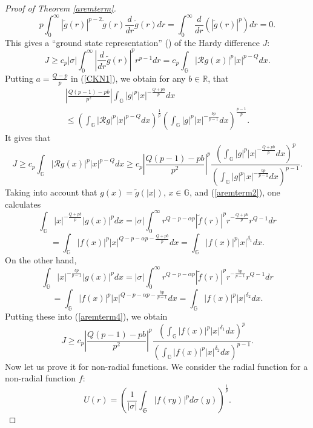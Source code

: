 \documentclass[a4paper,12pt,reqno]{amsart}
\renewcommand\eqref[1]{(\ref{#1})} %
\numberwithin{equation}{section}
\theoremstyle{plain}
\theoremstyle{definition}
\renewcommand{\wp}{\mathfrak S}
\begin{document}
\begin{proof}[Proof of Theorem \ref{aremterm}]
$$p\int_{0}^{\infty}|\widetilde{g}(r)|^{p-2}\widetilde{g}(r)\frac{d}{dr}\widetilde{g}(r)dr=\int_{0}^{\infty}
\frac{d}{dr}(|\widetilde{g}(r)|^{p})dr=0.$$
This gives a \enquote{ground state representation} (\cite{FrS08}) of the Hardy difference $J$:
\begin{equation}\label{aremterm3}
J\geq c_{p} |\sigma|\int_{0}^{\infty}\left|\frac{d}{dr}\widetilde{g}(r)\right|^{p}r^{p-1}dr=
c_{p}\int_{\mathbb{G}}|\mathcal{R}g(x)|^{p}|x|^{p-Q}dx.
\end{equation}
Putting $a=\frac{Q-p}{p}$ in \eqref{CKN1}, we obtain for any $b\in\mathbb{R}$, that
\begin{multline}\label{CKN2}
\left|\frac{Q(p-1)-pb}{p^{2}}\right|\int_{\mathbb{G}}|g|^{p}
|x|^{-\frac{Q+pb}{p}}dx \\
\leq\left(\int_{\mathbb{G}}
|\mathcal{R}g|^{p}|x|^{p-Q}dx\right)^{\frac{1}{p}}\left(\int_{\mathbb{G}}
|g|^{p}|x|^{-\frac{bp}{p-1}}dx\right)^{\frac{p-1}{p}}.
\end{multline}
It gives that
\begin{equation}\label{aremterm4}J\geq c_{p}\int_{\mathbb{G}}|\mathcal{R}g(x)|^{p}|x|^{p-Q}dx\geq c_{p}
\left|\frac{Q(p-1)-pb}{p^{2}}\right|^{p}\frac{\left(\int_{\mathbb{G}}|g|^{p}|x|^{-\frac{Q+pb}{p}}
dx\right)^{p}}{\left(\int_{\mathbb{G}}
|g|^{p}|x|^{-\frac{bp}{p-1}}dx\right)^{p-1}}.\end{equation}
Taking into account that $g(x)=\widetilde{g}(|x|)$, $x\in\mathbb{G}$, and \eqref{aremterm2}, one calculates
$$\int_{\mathbb{G}}|x|^{-\frac{Q+pb}{p}}|g(x)|^{p}dx=|\sigma|\int_{0}^{\infty}r^{Q-p-\alpha p}|\widetilde{f}(r)|^{p}r^{-\frac{Q+pb}{p}}r^{Q-1}dr
$$
$$=\int_{\mathbb{G}}|f(x)|^{p}|x|^{Q-p-\alpha p-\frac{Q+pb}{p}}dx=
\int_{\mathbb{G}}|f(x)|^{p}|x|^{\delta_{1}}dx.$$
On the other hand,
$$\int_{\mathbb{G}}|x|^{-\frac{bp}{p-1}}|g(x)|^{p}dx=|\sigma|\int_{0}^{\infty}r^{Q-p-\alpha p}|\widetilde{f}(r)|^{p}r^{-\frac{bp}{p-1}}r^{Q-1}dr$$
$$=\int_{\mathbb{G}}|f(x)|^{p}|x|^{Q-p-\alpha p-\frac{bp}{p-1}}dx=\int_{\mathbb{G}}|f(x)|^{p}|x|^{\delta_{2}}dx.$$
Putting these into \eqref{aremterm4}, we obtain
\begin{equation}\label{aremterm4_01}J\geq c_{p}
\left|\frac{Q(p-1)-pb}{p^{2}}\right|^{p}
\frac{\left(\int_{\mathbb{G}}|f(x)|^{p}|x|^{\delta_{1}}dx\right)^{p}}
{\left(\int_{\mathbb{G}}|f(x)|^{p}|x|^{\delta_{2}}dx\right)^{p-1}}.
\end{equation}
Now let us prove it for non-radial functions. We consider the radial function for a non-radial function $f$:
\begin{equation}\label{aremterm4_1}U(r)=\left(\frac{1}{|\sigma|}\int_{\wp}|f(ry)|^{p}d\sigma(y)\right)^{\frac{1}{p}}.\end{equation}

\end{proof}
\end{document}
